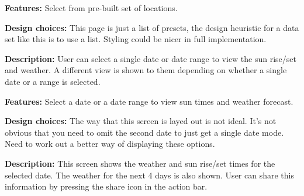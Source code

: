 \documentclass[11pt,english,numbers=endperiod,parskip=half]{scrartcl}
\begin{document}
\textbf{Features: }Select from pre-built set of locations.

\textbf{Design choices: }This page is just a list of presets, the design
heuristic for a data set like this is to use a list. Styling could be nicer in
full implementation.

\begin{figure}[H]
\end{figure}
\bigskip
\textbf{Description: }User can select a single date or date range to view the
sun rise/set and weather. A different view is shown to them depending on whether
a single date or a range is selected.

\textbf{Features: }Select a date or a date range to view sun times and weather forecast.

\textbf{Design choices: }The way that this screen is layed out is not ideal. It's
not obvious that you need to omit the second date to just get a single date mode.
Need to work out a better way of displaying these options.

\begin{figure}[H]
\end{figure}
\bigskip
\textbf{Description: }This screen shows the weather and sun rise/set times for
the selected date. The weather for the next 4 days is also shown. User can share
this information by pressing the share icon in the action bar.
\end{document}
